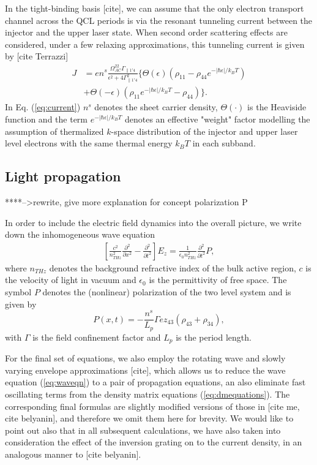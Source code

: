 \documentclass[11pt,final]{scrbook}
\def\p{\partial}
\begin{document}
In the tight-binding basis [cite], we can assume that the only electron transport channel across the QCL periods is via the resonant tunneling current between the injector and the upper laser state. When second order scattering effects are considered, under a few relaxing approximations, this tunneling current is given by [cite Terrazzi]
\begin{align}
\label{eq:current}
J &= en^s\frac{\Omega_{AC}^22\Gamma_{\parallel 1'4}}{\epsilon^2+4\Gamma_{\parallel 1'4}^2}\Big\{\Theta(\epsilon)(\rho_{11}-\rho_{44}e^{-|\hbar\epsilon|/k_BT}) \nonumber \\
&+\Theta(-\epsilon)(\rho_{11}e^{-|\hbar\epsilon|/k_BT}-\rho_{44})\Big\}.
\end{align}
In Eq. (\ref{eq:current}) $n^s$ denotes the sheet carrier density, $\Theta(\cdot)$ is the Heaviside function and the term $e^{-|\hbar\epsilon|/k_BT}$ denotes an effective "weight" factor modelling the assumption of thermalized $k$-space distribution of the injector and upper laser level electrons with the same thermal energy $k_BT$ in each subband.   

\subsection{Light propagation}
****-->rewrite, give more explanation for concept polarization P

In order to include the electric field dynamics into the overall picture, we write down the inhomogeneous wave equation 
\begin{align}
\label{eq:waveqn}
\left [\frac{c^2}{n_{THz}^2} \frac{\p^2}{\p x^2} -\frac{\p^2}{\p t^2} \right ] E_z =\frac{1}{\epsilon_0 n_{THz}^2}\frac{\p^2}{\p t^2}P,
\end{align}
where  $n_{THz}$ denotes the background refractive index of the bulk active region, $c$ is the velocity of light in vacuum and $\epsilon_0$ is the permittivity of free space. The symbol $P$ denotes the (nonlinear) polarization of the two level system and is given by 
\begin{equation}
P(x,t) =  -\frac{n^s}{L_p}\Gamma ez_{43} (\rho_{43}+\rho_{34}),  
\end{equation}
with $\Gamma$ is the field confinement factor and $L_p$ is the period length. 

For the final set of equations, we also employ the rotating wave and slowly varying envelope approximations [cite], which allows us to reduce  the wave equation (\ref{eq:waveqn}) to a pair of propagation equations, an also eliminate fast oscillating terms from the density matrix equations (\ref{eq:dmequations}). The corresponding final formulas are slightly modified versions of those in [cite me, cite belyanin], and therefore we omit them here for brevity. We would like to point out also that in all subsequent calculations, we have also taken into consideration the effect of the inversion grating on to the current density, in an analogous manner to [cite belyanin]. 
\end{document}
